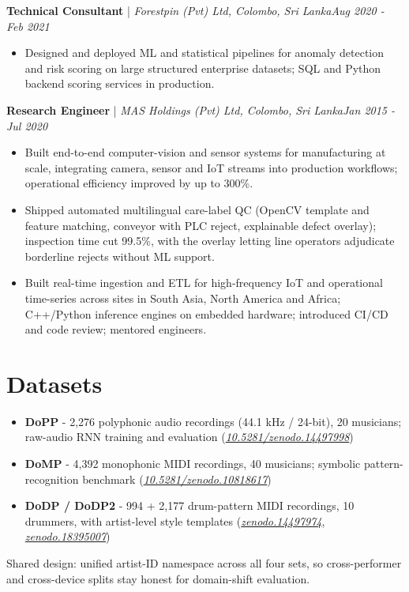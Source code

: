 \documentclass[11pt]{article}
\newenvironment{cvrole}[5]{%
  \par\noindent\textbf{\large #1} | \textit{\small #2, #3}\hfill \textit{\small #4 - #5}\par
  \begin{itemize}[leftmargin=2em, itemsep=-0.3em, topsep=-0.5em]%
}{%
  \end{itemize}\par\noindent\mbox{}\par\vspace{0.1em}%
}
\begin{document}
\begin{cvrole}{Technical Consultant}{Forestpin (Pvt) Ltd}{Colombo, Sri Lanka}{Aug 2020}{Feb 2021}
    \item Designed and deployed ML and statistical pipelines for anomaly detection and risk scoring on large structured enterprise datasets; SQL and Python backend scoring services in production.
\end{cvrole}

\begin{cvrole}{Research Engineer}{MAS Holdings (Pvt) Ltd}{Colombo, Sri Lanka}{Jan 2015}{Jul 2020}
    \item Built end-to-end computer-vision and sensor systems for manufacturing at scale, integrating camera, sensor and IoT streams into production workflows; operational efficiency improved by up to 300\%.
    \item Shipped automated multilingual care-label QC (OpenCV template and feature matching, conveyor with PLC reject, explainable defect overlay); inspection time cut 99.5\%, with the overlay letting line operators adjudicate borderline rejects without ML support.
    \item Built real-time ingestion and ETL for high-frequency IoT and operational time-series across sites in South Asia, North America and Africa; C++/Python inference engines on embedded hardware; introduced CI/CD and code review; mentored engineers.
\end{cvrole}

\section*{Datasets \footnotesize {}}
\begin{itemize}[leftmargin=1.2em, itemsep=-0.25em]
    \item \textbf{DoPP} - 2,276 polyphonic audio recordings (44.1 kHz / 24-bit), 20 musicians; raw-audio RNN training and evaluation (\href{https://doi.org/10.5281/zenodo.14497998}{\textit{10.5281/zenodo.14497998}})
    \item \textbf{DoMP} - 4,392 monophonic MIDI recordings, 40 musicians; symbolic pattern-recognition benchmark (\href{https://doi.org/10.5281/zenodo.10818617}{\textit{10.5281/zenodo.10818617}})
    \item \textbf{DoDP / DoDP2} - 994 + 2,177 drum-pattern MIDI recordings, 10 drummers, with artist-level style templates (\href{https://doi.org/10.5281/zenodo.14497974}{\textit{zenodo.14497974}}, \href{https://doi.org/10.5281/zenodo.18395007}{\textit{zenodo.18395007}})
\end{itemize}
Shared design: unified artist-ID namespace across all four sets, so cross-performer and cross-device splits stay honest for domain-shift evaluation.
\end{document}
